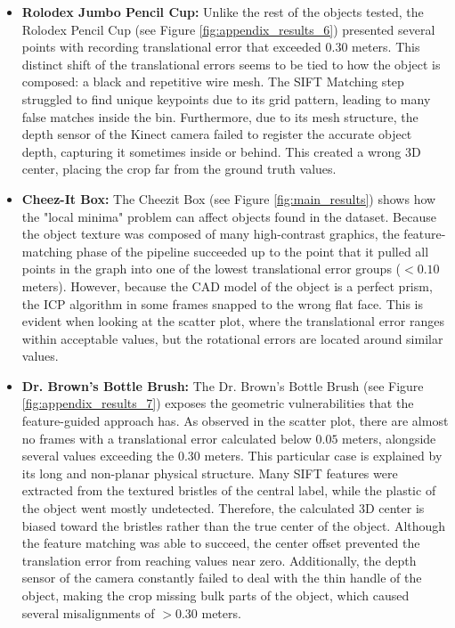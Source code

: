 \begin{itemize}
    \item \textbf{Rolodex Jumbo Pencil Cup:} 
    Unlike the rest of the objects tested, the Rolodex Pencil Cup (see Figure \ref{fig:appendix_results_6}) presented several points with recording translational error that exceeded $0.30$ meters. This distinct shift of the translational errors seems to be tied to how the object is composed: a black and repetitive wire mesh. The SIFT Matching step struggled to find unique keypoints due to its grid pattern, leading to many false matches inside the bin. Furthermore, due to its mesh structure, the depth sensor of the Kinect camera failed to register the accurate object depth, capturing it sometimes inside or behind. This created a wrong 3D center, placing the crop far from the ground truth values. 

    \item \textbf{Cheez-It Box:} 
    The Cheezit Box (see Figure \ref{fig:main_results}) shows how the "local minima" problem can affect objects found in the dataset. Because the object texture was composed of many high-contrast graphics, the feature-matching phase of the pipeline succeeded up to the point that it pulled all points in the graph into one of the lowest translational error groups ($< 0.10$ meters). However, because the CAD model of the object is a perfect prism, the ICP algorithm in some frames snapped to the wrong flat face. This is evident when looking at the scatter plot, where the translational error ranges within acceptable values, but the rotational errors are located around similar values.

    \item \textbf{Dr. Brown's Bottle Brush:} 
    The Dr. Brown's Bottle Brush (see Figure \ref{fig:appendix_results_7}) exposes the geometric vulnerabilities that the feature-guided approach has. As observed in the scatter plot, there are almost no frames with a translational error calculated below $0.05$ meters, alongside several values exceeding the $0.30$ meters. This particular case is explained by its long and non-planar physical structure. Many SIFT features were extracted from the textured bristles of the central label, while the plastic of the object went mostly undetected. Therefore, the calculated 3D center is biased toward the bristles rather than the true center of the object. Although the feature matching was able to succeed, the center offset prevented the translation error from reaching values near zero. Additionally, the depth sensor of the camera constantly failed to deal with the thin handle of the object, making the crop missing bulk parts of the object, which caused several misalignments of $>0.30$ meters.


\end{itemize}

